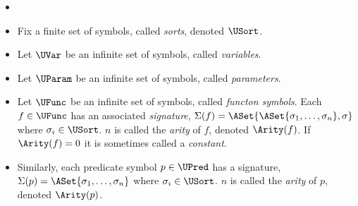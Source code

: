 \begin{definition}
  \begin{itemize}
  \item[]
  \item Fix a finite set of symbols, called \emph{sorts}, denoted $\USort$.
  \item Let $\UVar$ be an infinite set of symbols, called \emph{variables}.
  \item Let $\UParam$ be an infinite set of symbols, called \emph{parameters}.
  \item Let $\UFunc$ be an infinite set of symbols, called \emph{functon symbols}.
    Each $f\in\UFunc$ has an associated \emph{signature},
    $\Sigma(f) = \ASet{\ASet{\sigma_1,\ldots,\sigma_n}, \sigma}$ where
    $\sigma_i\in\USort$.  $n$ is called the \emph{arity} of $f$, denoted
    $\Arity(f)$.  If $\Arity(f)=0$ it is sometimes called a \emph{constant}.
  \item Similarly, each predicate symbol $p\in\UPred$ has a signature,
    $\Sigma(p) = \ASet{\sigma_1,\ldots,\sigma_n}$ where
    $\sigma_i\in\USort$.  $n$ is called the \emph{arity} of $p$, denoted
    $\Arity(p)$.
  \end{itemize}
\end{definition}

